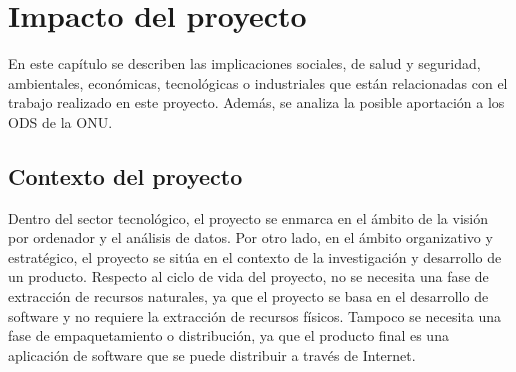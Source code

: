 \chapter{Impacto del proyecto} \label{sec:cap5}


    

\noindent En este capítulo se describen las implicaciones sociales, de salud y seguridad, ambientales, económicas, tecnológicas o industriales que están relacionadas con el trabajo realizado en este proyecto. Además, se analiza la posible aportación a los \ac{ODS} de la ONU.

\section{Contexto del proyecto}

Dentro del sector tecnológico, el proyecto se enmarca en el ámbito de la visión por ordenador y el análisis de datos. Por otro lado, en el ámbito organizativo y estratégico, el proyecto se sitúa en el contexto de la investigación y desarrollo de un producto. Respecto al ciclo de vida del proyecto, no se necesita una fase de extracción de recursos naturales, ya que el proyecto se basa en el desarrollo de software y no requiere la extracción de recursos físicos. Tampoco se necesita una fase de empaquetamiento o distribución, ya que el producto final es una aplicación de software que se puede distribuir a través de Internet. 


